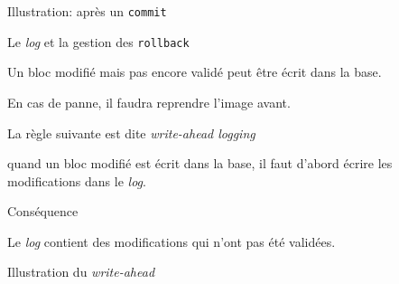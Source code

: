 \documentclass[aspectratio=169, handout]{beamer} %
\begin{document}
\begin{frame}{Illustration: après un \texttt{commit}}


\end{frame}
 

 
\begin{frame}{Le \textit{log} et la gestion des \texttt{rollback}}

Un bloc \alert{modifié} mais pas encore \alert{validé} peut être écrit
dans la base. 

\vfill

En cas de panne, il faudra reprendre l'image avant.

\vfill

La règle suivante est dite \textit{write-ahead logging}

\begin{redbullet}
  \item quand un bloc modifié est écrit dans la base, il faut \alert{d'abord} 
      écrire les modifications dans le \textit{log}.
\end{redbullet}

\vfill
Conséquence
\vfill

\begin{blocgauche}
\begin{redbullet}
  \item Le \textit{log} contient des modifications qui n'ont pas été validées.
\end{redbullet}
\end{blocgauche}

\end{frame}

\begin{frame}{Illustration du \textit{write-ahead}}


\end{frame}
\end{document}
